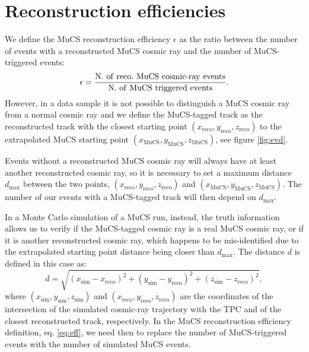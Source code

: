\documentclass[a4paper]{scrartcl}
\def\myhyphen{{\hbox{-}}}
\begin{document}
\section{Reconstruction efficiencies}\label{sec:reco}

We define the MuCS reconstruction efficiency $\epsilon$ as the ratio between the number of events with a reconstructed MuCS cosmic ray and the number of MuCS-triggered events:
\begin{equation}\label{eq:eff}
  \epsilon = \frac{\mathrm{N.~of~reco.~MuCS~cosmic\myhyphen ray~events}}{\mathrm{N.~of~MuCS~triggered~events}}.
\end{equation}
However, in a data sample it is not possible to distinguish a MuCS cosmic ray from a normal cosmic ray and we define the MuCS-tagged track as the reconstructed track with the closest starting point $(x_{\mathrm{reco}},y_{\mathrm{reco}},z_{\mathrm{reco}})$ to the extrapolated MuCS starting point $(x_{\mathrm{MuCS}},y_{\mathrm{MuCS}},z_{\mathrm{MuCS}})$, see figure \ref{fig:evd}.

Events without a reconstructed MuCS cosmic ray will always have at least another reconstructed cosmic ray, so it is necessary to set a maximum distance $d_{\mathrm{max}}$ between the two points, $(x_{\mathrm{reco}},y_{\mathrm{reco}},z_{\mathrm{reco}})$ and $(x_{\mathrm{MuCS}},y_{\mathrm{MuCS}},z_{\mathrm{MuCS}})$. The number of our events with a MuCS-tagged track will then depend on $d_{\mathrm{max}}$.

In a Monte Carlo simulation of a MuCS run, instead, the truth information allows us to verify if the MuCS-tagged cosmic ray is a real MuCS cosmic ray, or if it is another reconstructed cosmic ray, which happens to be mis-identified due to the extrapolated starting point distance being closer than $d_{\mathrm{max}}$.
The distance $d$ is defined in this case as:
\begin{equation}\label{eq:d_mc}
d = \sqrt{(x_{\mathrm{sim}}-x_{\mathrm{reco}})^2+(y_{\mathrm{sim}}-y_{\mathrm{reco}})^2+(z_{\mathrm{sim}}-z_{\mathrm{reco}})^2},
\end{equation}
where $(x_{\mathrm{sim}},y_{\mathrm{sim}},z_{\mathrm{sim}})$ and $(x_{\mathrm{reco}},y_{\mathrm{reco}},z_{\mathrm{reco}})$ are the coordinates of the intersection of the simulated cosmic-ray trajectory with the TPC and of the closest reconstructed track, respectively. In the MuCS reconstruction efficiency definition, eq. \eqref{eq:eff}, we need then to replace the number of MuCS-triggered events with the number of simulated MuCS events.
\end{document}
